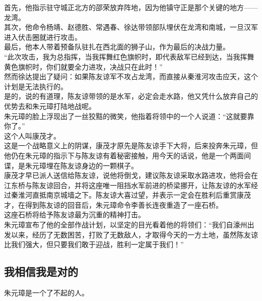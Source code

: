 \begin{multicols}{\theparacolNo}
首先，他指示驻守城正北方的邵荣放弃阵地，因为他镇守正是那个关键的地方——龙湾。\\

其次，他命令杨靖、赵德胜、常遇春、徐达带领部队埋伏在龙湾和南城，一旦汉军进入伏击圈就进行攻击。\\

最后，他本人带着预备队驻扎在西北面的狮子山，作为最后的决战力量。\\

“此次攻击，我为总指挥，当我挥舞红色旗帜时，即代表敌军已经到达，当我挥舞黄色旗帜时，你们就要全力进攻，决战只在此时！”\\

然而徐达提出了疑问：如果陈友谅军不攻占龙湾，而直接从秦淮河攻击应天，这个计划是无法执行的。\\

是的，说的有道理，陈友谅带领的是水军，必定会走水路，他又凭什么放弃自己的优势去和朱元璋打陆地战呢。\\

朱元璋的脸上浮现出了一丝狡黠的微笑，他指着将领中的一个人说道：“这就要靠你了。”\\

这个人叫康茂才。\\

这是一个战略意义上的阴谋，康茂才原先是陈友谅手下大将，后来投奔朱元璋，但他仍在朱元璋的指示下与陈友谅有着秘密接触，用今天的话说，他是一个两面间谍，是朱元璋埋在陈友谅身边的一颗棋子。\\

康茂才早已派人送信给陈友谅，说他将倒戈，建议陈友谅采取水路进攻，他将会在江东桥与陈友谅回合，并将这座唯一阻挡水军前进的桥梁挪开，让陈友谅的水军经过秦淮河直抵南京城墙之下。陈友谅大喜过望，并表示一定会在胜利后重赏康茂才，在得到陈友谅的回音后，朱元璋命令李善长连夜重造了一座石桥。\\

这座石桥将给予陈友谅最为沉重的精神打击。\\

朱元璋宣布了他的全部作战计划，以坚定的目光看着他的将领们：“我们自濠州出发以来，经历了无数困苦，打败了无数敌人，才取得今天的一方土地，虽然陈友谅比我们强大，但只要我们敢于迎战，胜利一定属于我们！”\\

\subsection{我相信我是对的}
朱元璋是一个了不起的人。\\


\end{multicols}

